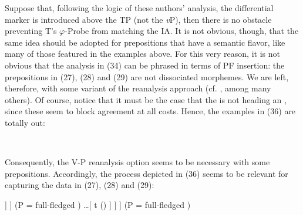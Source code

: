 \documentclass[output=paper]{langsci/langscibook}
\begin{document}
Suppose that, following the logic of these authors’ analysis, the differential marker is introduced above the TP (not the \textit{v}P), then there is no obstacle preventing T’s $\varphi ${}-Probe from matching the IA. It is not obvious, though, that the same idea should be adopted for prepositions that have a semantic flavor, like many of those featured in the examples above. For this very reason, it is not obvious that the analysis in (34) can be phrased in terms of PF insertion: the prepositions in (27), (28) and (29) are not dissociated morphemes. We are left, therefore, with some variant of the reanalysis approach (cf. \citealt{Hornstein1981,Kayne1975,Kayne2004}, among many others). Of course, notice that it must be the case that the  is not heading an , since these seem to block agreement at all costs. Hence, the examples in (36) are totally out:



\ea%
    \label{ex:gallego:36}\\
    \z
\z    

Consequently, the V-P reanalysis option seems to be necessary with some prepositions. Accordingly, the process depicted in (36) seems to be relevant for capturing the data in (27), (28) and (29):


\ea%
    \label{ex:gallego:37}
    \ea\onehalfspacing\relax [ SE \ConnectTail{\textbf{T}} ($\varphi $-Probe)  [\textsubscript{VP} V \ldots\xspace [  P \ConnectHead{\textbf{XP}} (\isi{Goal}) ] ] ] (P = full-fledged ) 
    \ex\onehalfspacing\relax [ SE \ConnectTail{\textbf{T}} ($\varphi $-Probe)  [\textsubscript{VP} [V-P] \ldots\xspace [ t   () ] ] ] (P = full-fledged )
    \z
\z
\end{document}
